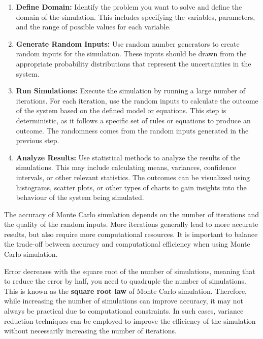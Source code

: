 \begin{enumerate}
    \item \textbf{Define Domain:} Identify the problem you want to solve and define the domain of
          the simulation. This includes specifying the variables, parameters, and the
          range of possible values for each variable.
    \item \textbf{Generate Random Inputs:} Use random number generators to create random inputs
          for the simulation. These inputs should be drawn from the appropriate
          probability distributions that represent the uncertainties in the system.
    \item \textbf{Run Simulations:} Execute the simulation by running a large number of
          iterations. For each iteration, use the random inputs to calculate the outcome
          of the system based on the defined model or equations. This step is
          deterministic, as it follows a specific set of rules or equations to produce an
          outcome. The randomness comes from the random inputs generated in the previous
          step.
    \item \textbf{Analyze Results:} Use statistical methods to analyze the results of the
          simulations. This may include calculating means, variances, confidence
          intervals, or other relevant statistics. The outcomes can be visualized using
          histograms, scatter plots, or other types of charts to gain insights into the
          behaviour of the system being simulated.
\end{enumerate}

The accuracy of Monte Carlo simulation depends on the number of iterations and
the quality of the random inputs. More iterations generally lead to more
accurate results, but also require more computational resources. It is
important to balance the trade-off between accuracy and computational
efficiency when using Monte Carlo simulation.

Error decreases with the square root of the number of simulations, meaning that
to reduce the error by half, you need to quadruple the number of simulations.
This is known as the \textbf{square root law} of Monte Carlo simulation. Therefore, while increasing the
number of simulations can improve accuracy, it may not always be practical due
to computational constraints. In such cases, variance reduction techniques can
be employed to improve the efficiency of the simulation without necessarily
increasing the number of iterations.

